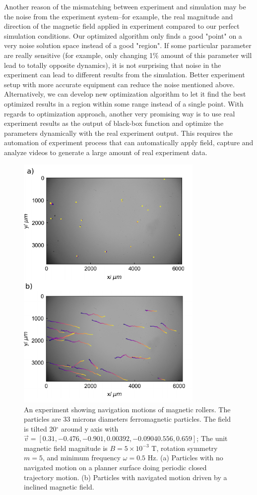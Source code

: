  Another reason of the mismatching between experiment and simulation may be the noise from the experiment system--for example, the real magnitude and direction of the magnetic field applied in experiment compared to our perfect simulation conditions. Our optimized algorithm only finds a good  "point" on a very noise solution space instead of a good "region". If some particular parameter are really sensitive (for example, only changing 1$\%$ amount of this parameter will lead to totally opposite dynamics), it is not surprising that noise in the experiment can lead to different results from the simulation. Better experiment setup with more accurate equipment can reduce the noise mentioned above. Alternatively, we can develop new optimization algorithm to let it find the best optimized results in a region within some range instead of a single point.  With regards to optimization approach, another very promising way is to use real experiment results as the output of black-box function and optimize the parameters dynamically with the real experiment output. This requires the automation of experiment process that can automatically apply field, capture and analyze  videos to generate a large amount of real experiment data\autocite{oulmas20183d}.

 \begin{figure}[p]
\centering
\includegraphics[width=9cm]{figures/5_6.pdf}
\caption{An experiment showing navigation motions of magnetic rollers. The particles are 33 microns diameters ferromagnetic particles. The field is tilted 20$^{\circ}$ around y axis with $\vec{v}=[0.31,-0.476,-0.901,0.00392, -0.0904
0.556,0.659]$; The unit magnetic field magnitude is $B=5 \times 10^{-3}$ T, rotation symmetry $m=5$, and minimum frequency $\omega=0.5$ Hz. (a) Particles with no navigated motion on a planner surface doing periodic closed trajectory motion.  (b) Particles with navigated motion driven by a inclined magnetic field.}
\label{fig:5.6}
\end{figure}
